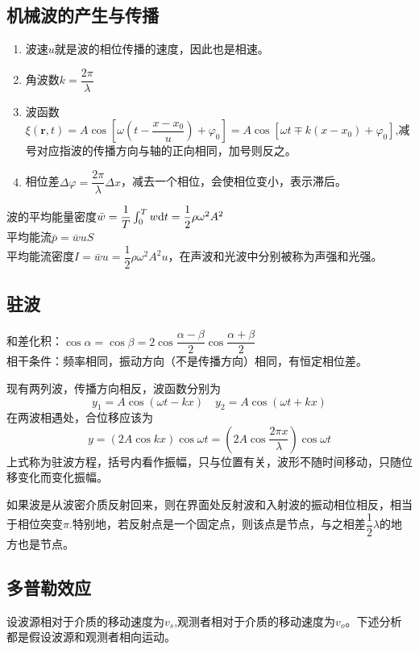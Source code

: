 \subsection{机械波的产生与传播}
\begin{enumerate}
	\item 波速$ u $就是波的相位传播的速度，因此也是相速。

	\item 角波数$ k=\dfrac{2\pi}{\lambda} $
	\item 波函数$ \xi(\bm{r},t) =A\cos [\omega(t-\dfrac{x-x_0}{u})+\varphi_0]=A\cos[\omega t\mp k(x-x_0)+\varphi_0]$,减号对应指波的传播方向与轴的正向相同，加号则反之。
	\item 相位差$ \Delta \varphi = \dfrac{2\pi}{\lambda} \Delta x $，减去一个相位，会使相位变小，表示滞后。
\end{enumerate}
波的平均能量密度$ \bar{w}=\dfrac{1}{T}\int_{0}^{T}w \mathrm{d} t=\dfrac{1}{2}\rho \omega^2A^2 $\\
平均能流$ \bar{p}=\bar{w}uS $\\
平均能流密度$ I=\bar{w}u=\dfrac{1}{2}\rho \omega^2A^2u $，在声波和光波中分别被称为声强和光强。

\subsection{驻波}
和差化积：$ \cos \alpha=\cos \beta=2\cos \dfrac{\alpha-\beta}{2}\cos \dfrac{\alpha+\beta}{2} $\\
相干条件：频率相同，振动方向（不是传播方向）相同，有恒定相位差。

现有两列波，传播方向相反，波函数分别为
\begin{equation}\label{key}
	y_1=A\cos (\omega t-kx)\quad	y_2=A\cos (\omega t+kx)
\end{equation}
在两波相遇处，合位移应该为
\begin{equation}\label{key}
	y=(2A\cos kx)\cos \omega t=(2A\cos \dfrac{2\pi x}{\lambda})\cos \omega t
\end{equation}
上式称为驻波方程，括号内看作振幅，只与位置有关，波形不随时间移动，只随位移变化而变化振幅。

如果波是从波密介质反射回来，则在界面处反射波和入射波的振动相位相反，相当于相位突变$ \pi $.特别地，若反射点是一个固定点，则该点是节点，与之相差$ \dfrac{1}{2}\lambda $的地方也是节点。

\subsection{多普勒效应}
设波源相对于介质的移动速度为$ v_s $,观测者相对于介质的移动速度为$ v_o $。下述分析都是假设波源和观测者相向运动。
